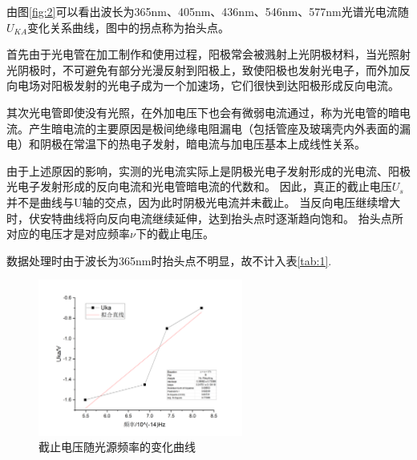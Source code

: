 \documentclass[12pt,a4paper,UTF8]{ctexart}
\begin{document}
由图\ref{fig:2}可以看出波长为365nm、405nm、436nm、546nm、577nm光谱光电流随$U_{KA}$变化关系曲线，图中的拐点称为抬头点。

首先由于光电管在加工制作和使用过程，阳极常会被溅射上光阴极材料，当光照射光阴极时，不可避免有部分光漫反射到阳极上，致使阳极也发射光电子，而外加反向电场对阳极发射的光电子成为一个加速场，它们很快到达阳极形成反向电流。

其次光电管即使没有光照，在外加电压下也会有微弱电流通过，称为光电管的暗电流。产生暗电流的主要原因是极间绝缘电阻漏电（包括管座及玻璃壳内外表面的漏电）和阴极在常温下的热电子发射，暗电流与加电压基本上成线性关系。

由于上述原因的影响，实测的光电流实际上是阴极光电子发射形成的光电流、阳极光电子发射形成的反向电流和光电管暗电流的代数和。
因此，真正的截止电压$U_s$并不是曲线与U轴的交点，因为此时阴极光电流并未截止。
当反向电压继续增大时，伏安特曲线将向反向电流继续延伸，达到抬头点时逐渐趋向饱和。
抬头点所对应的电压才是对应频率$\nu $下的截止电压。

数据处理时由于波长为365nm时抬头点不明显，故不计入表\ref{tab:1}.


\begin{table}[htbp]
	\centering
	\caption{不同波长光源饱和光电流数据}
	\vspace{0.7em}
\label{tab:1}%
\end{table}


\begin{figure}[!h]
	\centering
	\includegraphics[width=0.6\textwidth]{img//reg2.png}
	\caption{截止电压随光源频率的变化曲线}
	\label{fig:3}
\end{figure}
\end{document}
